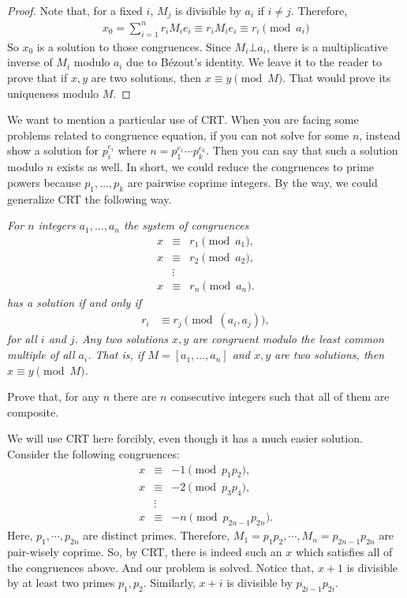 \documentclass{subfile}
\begin{document}
		\begin{proof}
			Note that, for a fixed $i$, $M_j$ is divisible by $a_i$ if $i\neq j$. Therefore,
			\begin{align*}
			x_0 = \sum_{i=1}^{n} r_i M_ie_i \equiv r_iM_ie_i\equiv r_i\pmod{a_i}
			\end{align*}
			So $x_0$ is a solution to those congruences. Since $M_i\bot a_i$, there is a multiplicative inverse of $M_i$ modulo $a_i$ due to B\'{e}zout's identity. We leave it to the reader to prove that if $x,y$ are two solutions, then $x\equiv y\pmod M$. That would prove its uniqueness modulo $M$.
		\end{proof}
	We want to mention a particular use of CRT. When you are facing some problems related to congruence equation, if you can not solve for some $n$, instead show a solution for $p_i^{e_i}$ where $n=p_1^{e_1}\cdots p_k^{e_k}$. Then you can say that such a solution modulo $n$ exists as well. In short, we could reduce the congruences to prime powers because $p_1,\ldots,p_k$ are pairwise coprime integers. By the way, we could generalize CRT the following way.
		\begin{theorem}\slshape
			For $n$ integers $a_1,\ldots,a_n$ the system of congruences
			\begin{eqnarray*}
				x & \equiv& r_1\pmod{a_1},\\
				x & \equiv& r_2\pmod{a_2},\\
				&\vdots&\\
				x & \equiv& r_n\pmod{a_n}.
			\end{eqnarray*}
			has a solution if and only if
			\begin{align*}
			r_i & \equiv r_j\pmod{(a_i,a_j)},
			\end{align*}
			for all $i$ and $j$. Any two solutions $x,y$ are congruent modulo the least common multiple of all $a_i$. That is, if $M=[a_1,\ldots,a_n]$ and $x,y$ are two solutions, then $x\equiv y\pmod M$.
		\end{theorem}
	
		\begin{problem}
			Prove that, for any $n$ there are $n$ consecutive integers such that all of them are composite.
		\end{problem}
		
		\begin{solution}
			We will use CRT here forcibly, even though it has a much easier solution. Consider the following congruences:
				\begin{eqnarray*}
					x & \equiv& -1\pmod{p_1p_2},\\
					x & \equiv& -2\pmod{p_3p_4},\\
					  & \vdots& \\
					x & \equiv& -n\pmod{p_{2n-1}p_{2n}}.
				\end{eqnarray*}
			Here, $p_1,\cdots,p_{2n}$ are distinct primes. Therefore, $M_1=p_1p_2,\cdots,M_n=p_{2n-1}p_{2n}$ are pair-wisely coprime. So, by CRT, there is indeed such an $x$ which satisfies all of the congruences above. And our problem is solved. Notice that, $x+1$ is divisible by at least two primes $p_1,p_2$. Similarly, $x+i$ is divisible by $p_{2i-1}p_{2i}$.
		\end{solution}
	
\end{document}
